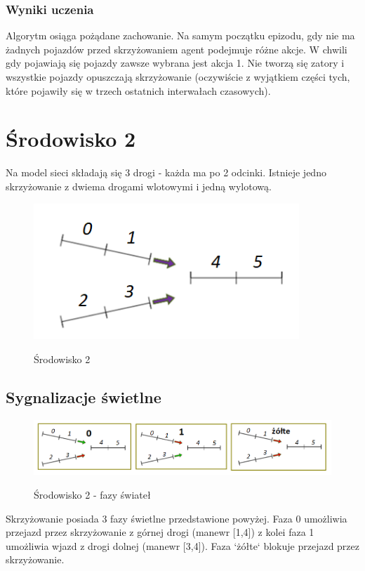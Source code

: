 \documentclass[12pt]{book}
\theoremstyle{plain}
\begin{document}


\subsubsection{Wyniki uczenia}
Algorytm osiąga pożądane zachowanie. Na samym początku epizodu, gdy nie ma żadnych pojazdów przed skrzyżowaniem agent podejmuje różne akcje. W chwili gdy pojawiają się pojazdy zawsze wybrana jest akcja 1. Nie tworzą się zatory i wszystkie pojazdy opuszczają skrzyżowanie (oczywiście z wyjątkiem części tych, które pojawiły się w trzech ostatnich interwałach czasowych).
\section{Środowisko 2}
Na model sieci składają się 3 drogi - każda ma po 2 odcinki. Istnieje jedno skrzyżowanie z dwiema drogami wlotowymi i jedną wylotową.
	\begin{figure}[H]
	\centering
	\includegraphics[width=10cm]{images/env_14_italic2}
	\label{fig:env_14}
	\caption{Środowisko 2}
\end{figure}

\subsection{Sygnalizacje świetlne}	
\begin{figure}[H]
	\centering
	\includegraphics[width=17cm]{images/env_14_fazy_italic3}
	\label{fig:env_14_fazy}
	\caption{Środowisko 2 - fazy świateł}
\end{figure}\noindent
Skrzyżowanie posiada 3 fazy świetlne przedstawione powyżej. Faza 0 umożliwia przejazd przez skrzyżowanie z górnej drogi (manewr [1,4]) z kolei faza 1 umożliwia wjazd z drogi dolnej (manewr [3,4]). Faza `żółte` blokuje przejazd przez skrzyżowanie.
\end{document}
